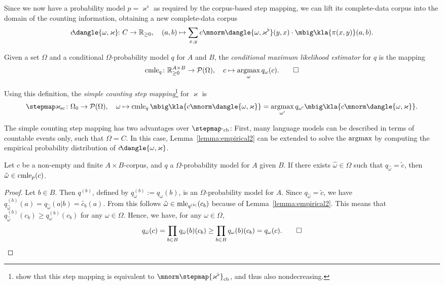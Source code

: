 Since we now have a probability model $p = \varkappa^\flat$ as required by the
corpus-based step mapping, we can lift its complete-data corpus into the domain
of the counting information, obtaining a new complete-data corpus
\[
 c\!\dangle{\omega,\varkappa}\!\colon C \to \zr_{\geq0}, \quad
 (a,b) \mapsto \sum_{x,y} c\mnorm\dangle{\omega,\varkappa^\flat}(y,x) \cdot \mbig\kla{\pi(x,y)}(a,b).
\]

\begin{definition}
 Given a set $\Omega$ and a conditional $\Omega$-probability model $q$ for $A$
 and $B$, the \emph{conditional maximum likelihood estimator} for $q$ is the mapping
 \[
  \cmle_q\colon \zr_{\geq0}^{A\times B} \to \up(\Omega),
  \quad
  c \mapsto \argmax_\omega q_\omega(c). \qedhere
 \]
\end{definition}

Using this definition, the \emph{simple counting step
mapping}\footnote{\cite[p.~13]{bucstuvog15} show that this step mapping is
equivalent to $\mnorm\stepmap{\varkappa^\flat}_\mathrm{cb}$, and thus also
nondecreasing.} for $\varkappa$ is
\[
 \stepmap\varkappa_\mathrm{sc}\colon \Omega_0 \to \up(\Omega), \quad
 \omega \mapsto \cmle_q\mbig\kla{c\mnorm\dangle{\omega,\varkappa}} = \argmax_{\omega'} q_{\omega'}\mbig\kla{c\mnorm\dangle{\omega,\varkappa}}.
\]

The simple counting step mapping has two advantages over
$\stepmap\cdot_\mathrm{cb}$: First, many language models can be described in
terms of countable events only, such that $\Omega = C$. In this case,
Lemma~\ref{lemma:empirical2} can be extended to solve the $\argmax$ by computing
the empirical probability distribution of $c\!\dangle{\omega,\varkappa}$.

\begin{lemma}\label{lemma:empirical3}
 Let $c$ be a non-empty and finite $A\times B$-corpus, and $q$ a
 $\Omega$-probability model for $A$ given $B$. If there exists
 $\hat\omega\in\Omega$ such that $q_{\hat\omega} = \tilde c$, then
 $\hat\omega\in\operatorname{cmle}_p(c)$.
\end{lemma}

\begin{proof}
 Let $b\in B$. Then $q^{(b)}$, defined by $q_\omega^{(b)} := q_\omega(b)$, is
 an $\Omega$-probability model for $A$. Since $q_{\hat\omega}=\tilde c$, we
 have $q_{\hat\omega}^{(b)}(a) = q_{\hat\omega}(a|b) = \widetilde{c_b}(a)$.
 From this follows $\hat\omega\in\operatorname{mle}_{q^{(b)}}(c_b)$ because of
 Lemma~\ref{lemma:empirical2}. This means that $q_{\hat\omega}^{(b)}(c_b) \geq
 q_\omega^{(b)}(c_b)$ for any $\omega\in\Omega$. Hence, we have, for any
 $\omega\in\Omega$,
 \[
  q_{\hat\omega}(c) = \prod_{b\in B} q_{\hat\omega}(b)(c_b) \geq \prod_{b\in B} q_\omega(b)(c_b) = q_\omega(c).
  \qedhere
 \]
\end{proof}


